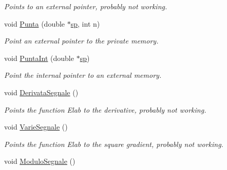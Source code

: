 \begin{DoxyCompactItemize}
\begin{DoxyCompactList}\small\item\em \-Points to an external pointer, probably not working. \end{DoxyCompactList}\item 
\hypertarget{classVarDatFile_a3459dd82527a16fe552b58f9bbb3beca}{void \hyperlink{classVarDatFile_a3459dd82527a16fe552b58f9bbb3beca}{\-Punta} (double $\ast$\hyperlink{classVarDatFile_a0e376f4d59c4a98b04daf57047cad5f9}{sp}, int n)}\label{classVarDatFile_a3459dd82527a16fe552b58f9bbb3beca}

\begin{DoxyCompactList}\small\item\em \-Point an external pointer to the private memory. \end{DoxyCompactList}\item 
\hypertarget{classVarDatFile_ad4ea52d09ccc5d7b38b2952c4fdaa1a6}{void \hyperlink{classVarDatFile_ad4ea52d09ccc5d7b38b2952c4fdaa1a6}{\-Punta\-Int} (double $\ast$\hyperlink{classVarDatFile_a0e376f4d59c4a98b04daf57047cad5f9}{sp})}\label{classVarDatFile_ad4ea52d09ccc5d7b38b2952c4fdaa1a6}

\begin{DoxyCompactList}\small\item\em \-Point the internal pointer to an external memory. \end{DoxyCompactList}\item 
\hypertarget{classVarDatFile_a5a90e3f39948e4e3e870c9d83af5eef0}{void \hyperlink{classVarDatFile_a5a90e3f39948e4e3e870c9d83af5eef0}{\-Derivata\-Segnale} ()}\label{classVarDatFile_a5a90e3f39948e4e3e870c9d83af5eef0}

\begin{DoxyCompactList}\small\item\em \-Points the function \-Elab to the derivative, probably not working. \end{DoxyCompactList}\item 
\hypertarget{classVarDatFile_af79a8603c9c35b3f0b3018090697fca8}{void \hyperlink{classVarDatFile_af79a8603c9c35b3f0b3018090697fca8}{\-Varie\-Segnale} ()}\label{classVarDatFile_af79a8603c9c35b3f0b3018090697fca8}

\begin{DoxyCompactList}\small\item\em \-Points the function \-Elab to the square gradient, probably not working. \end{DoxyCompactList}\item 
\hypertarget{classVarDatFile_a72776345635c4c0717fce1b11f03d625}{void \hyperlink{classVarDatFile_a72776345635c4c0717fce1b11f03d625}{\-Modulo\-Segnale} ()}\label{classVarDatFile_a72776345635c4c0717fce1b11f03d625}


\end{DoxyCompactItemize}
